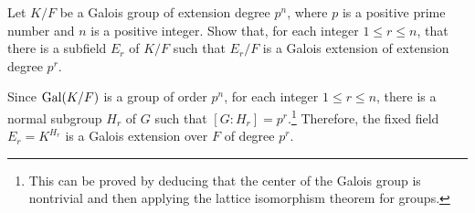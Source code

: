 \begin{prob}
    Let $K/F$ be a Galois group of extension degree $p^n$, where $p$ is a positive prime number and $n$ is a positive integer.
    Show that, for each integer $1\leq r\leq n$, that there is a subfield $E_r$ of $K/F$ such that $E_r/F$ is a Galois extension of extension degree $p^r$.
\end{prob}
\begin{sol}
    Since ${\textrm{Gal}({K/F})}$ is a group of order $p^n$, for each integer $1\leq r\leq n$, there is a normal subgroup $H_r$ of $G$ such that $[G: H_r]=p^r$.\footnote{This can be proved by deducing that the center of the Galois group is nontrivial and then applying the lattice isomorphism theorem for groups.}
    Therefore, the fixed field $E_r=K^{H_r}$ is a Galois extension over $F$ of degree $p^r$.
\end{sol}

